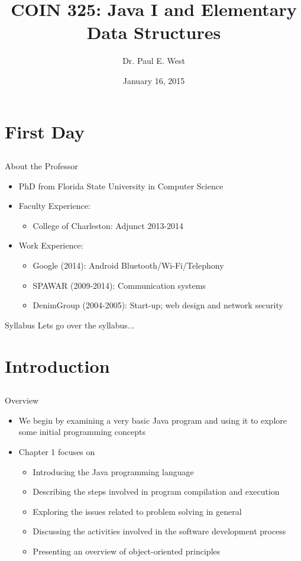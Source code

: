 \documentclass{beamer}
\title{COIN 325: Java I and Elementary Data Structures}
\author{Dr. Paul E. West}
\institute{
  Department of Computer Science\\
  Charleston Southern University
}
\date{January 16, 2015}
\begin{document}
\begin{frame}
  \titlepage
\end{frame}

\section{First Day}
\subsection{}
\begin{frame}{About the Professor}
\begin{itemize}
\item PhD from Florida State University in Computer Science
\item Faculty Experience:
\begin{itemize}
\item College of Charleston: Adjunct 2013-2014
\end{itemize}
\item Work Experience:
\begin{itemize}
\item Google (2014): Android Bluetooth/Wi-Fi/Telephony
\item SPAWAR (2009-2014): Communication systems
\item DenimGroup (2004-2005): Start-up; web design and network security
\end{itemize}
\end{itemize}
\end{frame}

\begin{frame}{Syllabus}
Lets go over the syllabus...
\end{frame}

\section{Introduction}
\subsection{}

\begin{frame}{Overview}
\begin{itemize}
\item We begin by examining a very basic Java program and using it to explore some initial programming concepts
\item Chapter 1 focuses on
\begin{itemize}
\item Introducing the Java programming language
\item Describing the steps involved in program compilation and execution
\item Exploring the issues related to problem solving in general
\item Discussing the activities involved in the software development process
\item Presenting an overview of object-oriented principles
\end{itemize}
\end{itemize}
\end{frame}
\end{document}
